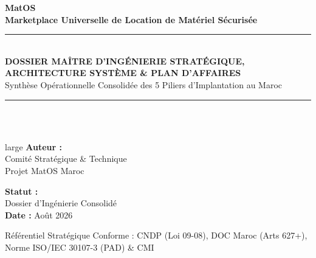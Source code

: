 \documentclass[11pt,a4paper]{report}
\begin{document}
\begin{titlepage}
    \centering
    \vspace*{1.5cm}
    {\Huge\bfseries\color{primaryNavy} MatOS}\\[0.4cm]
    {\LARGE\bfseries\color{accentTeal} Marketplace Universelle de Location de Matériel Sécurisée}\\[1.5cm]
    
    \rule{\linewidth}{1.8pt}\\[0.4cm]
    {\huge\bfseries DOSSIER MAÎTRE D'INGÉNIERIE STRATÉGIQUE,\\ ARCHITECTURE SYSTÈME \& PLAN D'AFFAIRES}\\[0.3cm]
    {\large Synthèse Opérationnelle Consolidée des 5 Piliers d'Implantation au Maroc}\\[0.4cm]
    \rule{\linewidth}{1.8pt}\\[2.2cm]
    
    \begin{minipage}{0.45\textwidth}
        \begin{flushleft} \\large
            \textbf{Auteur :}\\
            Comité Stratégique \& Technique\\
            Projet MatOS Maroc
        \end{flushleft}
    \end{minipage}
    \hfill
    \begin{minipage}{0.45\textwidth}
        \begin{flushright} \large
            \textbf{Statut :}\\
            Dossier d'Ingénierie Consolidé\\
            \textbf{Date :} Août 2026
        \end{flushright}
    \end{minipage}
    
    \vfill
    {\small Référentiel Stratégique Conforme : CNDP (Loi 09-08), DOC Maroc (Arts 627+), Norme ISO/IEC 30107-3 (PAD) \& CMI}
\end{titlepage}

\tableofcontents
\newpage
\end{document}
